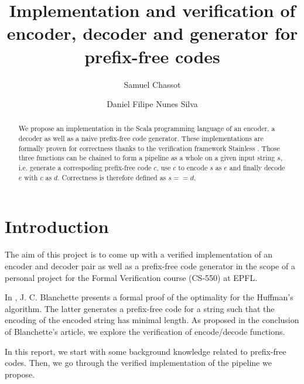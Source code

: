 \documentclass[a4paper,UKenglish,cleveref, autoref, thm-restate]{lipics-v2021}
\title{Implementation and verification of encoder, decoder and generator for prefix-free codes}
\author{Samuel Chassot}{EPFL}{samuel.chassot@epfl.ch}{}{}
\author{Daniel Filipe Nunes Silva}{EPFL}{daniel.nunessilva@epfl.ch}{}{}
\begin{document}
\maketitle

\begin{abstract}
    We propose an implementation in the Scala programming language of an encoder, a decoder as well as a naive prefix-free code generator. These implementations are formally proven for correctness thanks to the verification framework Stainless \cite{stainless}. Those three functions can be chained to form a pipeline as a whole on a given input string $s$, i.e. generate a correspoding prefix-free code $c$, use $c$ to encode $s$ as $e$ and finally decode $e$ with $c$ as $d$. Correctness is therefore defined as $s == d$.
\end{abstract}

\lstset{language=scala}


\section{Introduction}
\label{sec:intro}

The aim of this project is to come up with a verified implementation of an encoder and decoder pair as well as a prefix-free code generator in the scope of a personal project for the Formal Verification course (CS-550) at EPFL.

In \cite{blanchette}, J. C. Blanchette presents a formal proof of the optimality for the Huffman's algorithm. The latter generates a prefix-free code for a string such that the encoding of the encoded string has minimal length. As proposed in the conclusion of Blanchette's article, we explore the verification of encode/decode functions.

In this report, we start with some background knowledge related to prefix-free codes. Then, we go through the verified implementation of the pipeline we propose.
\end{document}
